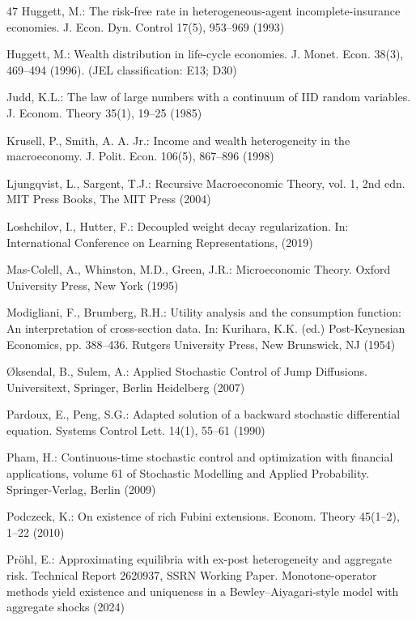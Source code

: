 \documentclass[11pt,oneside,english,reqno,dvipsnames,table]{amsart}
\numberwithin{equation}{section}
\theoremstyle{plain}
\theoremstyle{definition}
\theoremstyle{remark}
\theoremstyle{plain}
\theoremstyle{plain}
\theoremstyle{plain}
\theoremstyle{plain}
\theoremstyle{plain}
\theoremstyle{plain}
\theoremstyle{plain}
\numberwithin{thm}{section}
\begin{document}
\begin{thebibliography}{47}
Huggett, M.: The risk-free rate in heterogeneous-agent incomplete-insurance economies. J. Econ. Dyn. Control 17(5), 953--969 (1993)

Huggett, M.: Wealth distribution in life-cycle economies. J. Monet. Econ. 38(3), 469--494 (1996). (JEL classification: E13; D30)

Judd, K.L.: The law of large numbers with a continuum of IID random variables. J. Econom. Theory 35(1), 19--25 (1985)

Krusell, P., Smith, A. A. Jr.: Income and wealth heterogeneity in the macroeconomy. J. Polit. Econ. 106(5), 867--896 (1998)

Ljungqvist, L., Sargent, T.J.: Recursive Macroeconomic Theory, vol. 1, 2nd edn. MIT Press Books, The MIT Press (2004)

Loshchilov, I., Hutter, F.: Decoupled weight decay regularization. In: International Conference on Learning Representations, (2019)

Mas-Colell, A., Whinston, M.D., Green, J.R.: Microeconomic Theory. Oxford University Press, New York (1995)

Modigliani, F., Brumberg, R.H.: Utility analysis and the consumption function: An interpretation of cross-section data. In: Kurihara, K.K. (ed.) Post-Keynesian Economics, pp. 388--436. Rutgers University Press, New Brunswick, NJ (1954)

{\O}ksendal, B., Sulem, A.: Applied Stochastic Control of Jump Diffusions. Universitext, Springer, Berlin Heidelberg (2007)

Pardoux, E., Peng, S.G.: Adapted solution of a backward stochastic differential equation. Systems Control Lett. 14(1), 55--61 (1990)

Pham, H.: Continuous-time stochastic control and optimization with financial applications, volume 61 of Stochastic Modelling and Applied Probability. Springer-Verlag, Berlin (2009)

Podczeck, K.: On existence of rich Fubini extensions. Econom. Theory 45(1--2), 1--22 (2010)

Pr\"ohl, E.: Approximating equilibria with ex-post heterogeneity and aggregate risk. Technical Report 2620937, SSRN Working Paper. Monotone-operator methods yield existence and uniqueness in a Bewley--Aiyagari-style model with aggregate shocks (2024)


\end{thebibliography}
\end{document}
